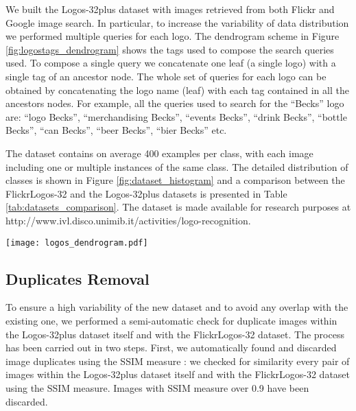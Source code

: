 \documentclass[final,5p,twocolumn]{elsarticle}
\begin{document}
We built the Logos-32plus dataset with images retrieved from both Flickr and Google image search. In particular, to increase the variability of data distribution we performed multiple queries for each logo. The dendrogram scheme in Figure \ref{fig:logostags_dendrogram} shows the tags used to compose the search queries used. To compose a single query we concatenate one leaf (a single logo) with a single tag of an ancestor node. The whole set of queries for each logo can be obtained by concatenating the logo name (leaf) with each tag contained in all the ancestors nodes. For example, all the queries used to search for the ``Becks'' logo are: ``logo Becks'', ``merchandising Becks'', ``events Becks'', ``drink Becks'', ``bottle Becks'', ``can Becks'', ``beer Becks'', ``bier Becks'' etc.

The dataset contains on average 400 examples per class, with each image including one or multiple instances of the same class. The detailed distribution of classes is shown in Figure \ref{fig:dataset_histogram} and a comparison between the FlickrLogos-32 and the Logos-32plus datasets is presented in Table \ref{tab:datasets_comparison}.
{The dataset is made available for research purposes at http://www.ivl.disco.unimib.it/activities/logo-recognition.}

\begin{figure*}[tb]
	\texttt{[image: logos\_dendrogram.pdf]}
	\centering
	\caption{Dendrogram representing the queries composition used to download the Logos-32plus dataset. To retrieve images of becks logos we used for instance: ``logo Becks'', ``merchandising Becks'', ``drink Becks'', ``bottle Becks'', ``beer Becks'' etc.}
	\label{fig:logostags_dendrogram}
\end{figure*}







\subsection{Duplicates Removal}
\label{sec:duplicatesremoval}
To ensure a high variability of the new dataset and to avoid any overlap with the existing one, we performed a semi-automatic check for duplicate images within the Logos-32plus dataset itself and with the FlickrLogos-32 dataset. The process has been carried out in two steps. First, we automatically found and discarded image duplicates using the SSIM measure \cite{wang2004image}: we checked for similarity every pair of images within the Logos-32plus dataset itself and with the FlickrLogos-32 dataset using the SSIM measure. Images with SSIM measure over 0.9 have been discarded.
\end{document}
